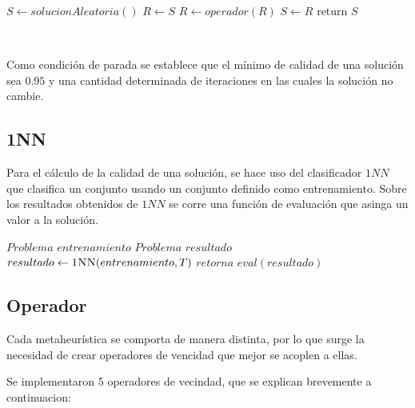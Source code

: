 \documentclass[11pt]{article}
\begin{document}
    {\fontsize{10}{10}\selectfont
    \begin{algorithmic}
            \State $S \gets solucionAleatoria()$
                \State $R \gets S$
                \State $R \gets operador(R)$
                    \State $S \gets R$
                \EndIf
            \EndWhile
            \State return $S$
        \EndFunction
    \end{algorithmic}
    }

    ~\ 

    Como condición de parada se establece que el mínimo de calidad de una solución sea $0.95$ y una cantidad determinada de iteraciones en las cuales la solución no cambie.

\subsection{1NN}
    Para el cálculo de la calidad de una solución, se hace uso del clasificador $1NN$ que clasifica un conjunto usando un conjunto definido como entrenamiento. Sobre los resultados obtenidos de $1NN$ se corre una función de evaluación que asinga un valor a la solución. \\

    {\fontsize{10}{10}\selectfont
    \begin{algorithmic}
            \State $Problema$  $entrenamiento$
            \State $Problema$  $resultado$
            \State $resultado \gets \Call{1NN}{entrenamiento, T}$
            \State $retorna$ $eval(resultado)$
        \EndFunction
    \end{algorithmic}
    }


\subsection{Operador}

Cada metaheurística se comporta de manera distinta, por lo
que surge la necesidad de crear operadores de vencidad
que mejor se acoplen a ellas.

Se implementaron 5 operadores de vecindad, que se explican brevemente
a continuacion:
\end{document}
